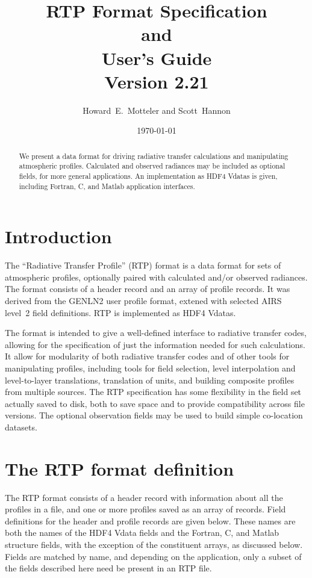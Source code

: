 \documentclass[11pt]{article}
\title{{\bf RTP Format Specification\\
                and\\
        User's Guide}\bigskip \\
        {Version 2.21}\bigskip \\ }
\author{Howard~E.~Motteler and Scott~Hannon}
\date{\today}
\begin{document}
\maketitle

\begin{abstract}

  \noindent
  We present a data format for driving radiative transfer
  calculations and manipulating atmospheric profiles.  Calculated
  and observed radiances may be included as optional fields, for
  more general applications.  An implementation as HDF4 Vdatas is
  given, including Fortran, C, and Matlab application interfaces.

\end{abstract}


\section{Introduction}

The ``Radiative Transfer Profile'' (RTP) format is a data format for
sets of atmospheric profiles, optionally paired with calculated
and/or observed radiances.  The format consists of a header record
and an array of profile records.  It was derived from the GENLN2
user profile format, extened with selected AIRS level~2 field
definitions.  RTP is implemented as HDF4 Vdatas.

The format is intended to give a well-defined interface to radiative
transfer codes, allowing for the specification of just the
information needed for such calculations.  It allow for modularity
of both radiative transfer codes and of other tools for manipulating
profiles, including tools for field selection, level interpolation
and level-to-layer translations, translation of units, and building
composite profiles from multiple sources.  The RTP specification has
some flexibility in the field set actually saved to disk, both to
save space and to provide compatibility across file versions.  The
optional observation fields may be used to build simple co-location
datasets.

\section{The RTP format definition}

The RTP format consists of a header record with information about
all the profiles in a file, and one or more profiles saved as an
array of records.  Field definitions for the header and profile
records are given below.  These names are both the names of the HDF4
Vdata fields and the Fortran, C, and Matlab structure fields, with
the exception of the constituent arrays, as discussed below.  Fields
are matched by name, and depending on the application, only a subset
of the fields described here need be present in an RTP file.
\end{document}
